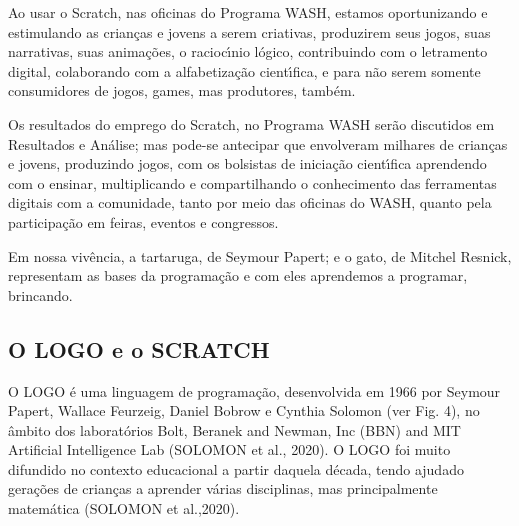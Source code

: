 \documentclass[
12pt,		%
openright,	%
twoside,  %
a4paper,			%
chapter=TITLE,		%
english,			%
french,				%
spanish,			%
brazil				%
]{USPSC-classe/USPSC}
\begin{document}
Ao usar o Scratch, nas oficinas do Programa WASH, estamos oportunizando e estimulando \textquotedbl as crian\c{c}as e jovens a serem criativas, produzirem seus jogos, suas narrativas, suas anima\c{c}\~oes, o racioc\'{\i}nio l\'ogico, contribuindo com o letramento digital, colaborando com a alfabetiza\c{c}\~ao cient\'{\i}fica, e para n\~ao serem somente consumidores de jogos, games, mas produtores, tamb\'em\textquotedbl .









Os resultados do emprego do Scratch, no Programa WASH ser\~ao discutidos em Resultados e An\'alise; mas pode-se antecipar que envolveram milhares de crian\c{c}as e jovens, produzindo jogos, com os bolsistas de inicia\c{c}\~ao cient\'{\i}fica aprendendo com o ensinar, multiplicando e compartilhando o conhecimento das ferramentas digitais  com a comunidade, tanto por meio das oficinas do WASH, quanto pela participa\c{c}\~ao em feiras, eventos e congressos.









Em nossa viv\^encia, a tartaruga, de Seymour Papert; e o gato, de Mitchel Resnick,  representam as bases da  programa\c{c}\~ao e com eles aprendemos a  programar, brincando.









\subsection[O LOGO e o SCRATCH]{O LOGO e o SCRATCH}\label{O LOGO e o SCRATCH}
O LOGO \'e uma linguagem de programa\c{c}\~ao, desenvolvida em 1966 por Seymour Papert, Wallace Feurzeig, Daniel Bobrow e Cynthia Solomon (ver Fig. 4), no \^ambito dos laborat\'orios Bolt, Beranek and Newman, Inc (BBN) and MIT Artificial Intelligence Lab (SOLOMON et al., 2020). O LOGO foi muito difundido no contexto educacional a partir daquela d\'ecada, tendo ajudado gera\c{c}\~oes de crian\c{c}as a aprender v\'arias disciplinas, mas principalmente matem\'atica (SOLOMON et al.,2020).
\end{document}
